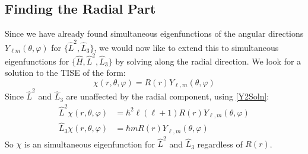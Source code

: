 \documentclass[../main.tex]{subfiles}
\begin{document}
\subsection{Finding the Radial Part}
Since we have already found simultaneous eigenfunctions of the angular directions $Y_{\ell m}(\theta, \varphi)$ for $\{\hat{L}^2, \hat{L}_3\}$, we would now like to extend this to simultaneous eigenfunctions for $\{\hat{H}, \hat{L}^2, \hat{L}_3\}$ by solving along the radial direction.
We look for a solution to the TISE of the form:
\[
  \chi(r, \theta, \varphi) = R(r)Y_{\ell, m}(\theta, \varphi)
\]
Since $\hat{L}^2$ and $\hat{L}_3$ are unaffected by the radial component, using \cref{Y2Soln}:
\begin{align*}
  \hat{L}^2 \chi(r, \theta, \varphi) &= \hbar^2 \ell(\ell + 1) R(r)Y_{\ell, m}(\theta, \varphi) \\
  \hat{L}_3 \chi(r, \theta, \varphi) &= \hbar m R(r)Y_{\ell, m}(\theta, \varphi)
\end{align*}
So $\chi$ is an simultaneous eigenfunction for $\hat{L}^2$ and $\hat{L}_3$ regardless of $R(r)$.
\end{document}
